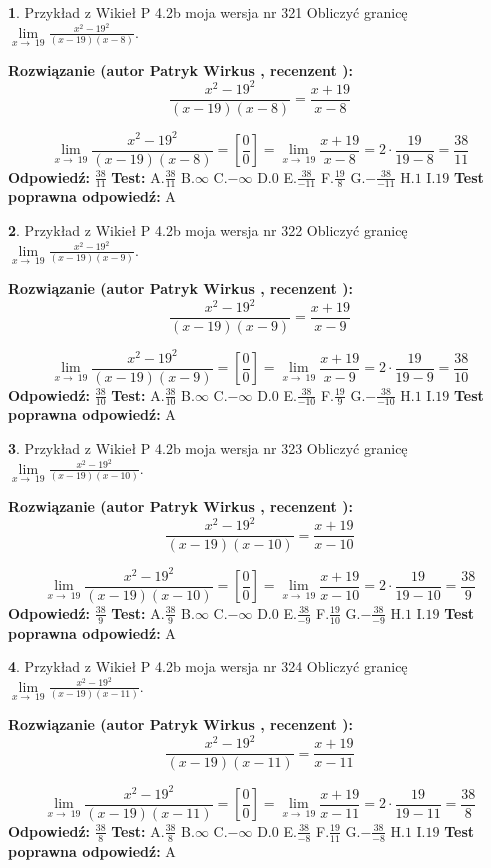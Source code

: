 \documentclass[12pt, a4paper]{article}
\theoremstyle{definition} %
\newtheorem{zad}{}
\newcommand{\zadStart}[1]{\begin{zad}#1\newline}
\newcommand{\zadStop}{\end{zad}}
\newcommand{\rozwStart}[2]{\noindent \textbf{Rozwiązanie (autor #1 , recenzent #2): }\newline}
\newcommand{\rozwStop}{\newline}
\newcommand{\odpStart}{\noindent \textbf{Odpowiedź:}\newline}
\newcommand{\odpStop}{\newline}
\newcommand{\testStart}{\noindent \textbf{Test:}\newline}
\newcommand{\testStop}{\newline}
\newcommand{\kluczStart}{\noindent \textbf{Test poprawna odpowiedź:}\newline}
\newcommand{\kluczStop}{\newline}
\begin{document}
\zadStart{Przykład z Wikieł P 4.2b moja wersja nr 321}
Obliczyć granicę $\lim\limits_{x\to\ 19}\frac{x^{2}-19^{2}}{(x-19)(x-8)}$.
\zadStop
\rozwStart{Patryk Wirkus}{}
$$\frac{x^{2}-19^{2}}{(x-19)(x-8)}=\frac{x+19}{x-8}$$

$$\lim\limits_{x\to\ 19}\frac{x^{2}-19^{2}}{(x-19)(x-8)}=[\frac{0}{0}]=\lim\limits_{x\to\ 19}\frac{x+19}{x-8}=2 \cdot \frac{19}{19-8} = \frac{38}{11}$$
\rozwStop
\odpStart
$\frac{38}{11}$
\odpStop
\testStart
A.$\frac{38}{11}$
B.$\infty$
C.$-\infty$
D.$0$
E.$\frac{38}{-11}$
F.$\frac{19}{8}$
G.$-\frac{38}{-11}$
H.$1$
I.$19$
\testStop
\kluczStart
A
\kluczStop



\zadStart{Przykład z Wikieł P 4.2b moja wersja nr 322}
Obliczyć granicę $\lim\limits_{x\to\ 19}\frac{x^{2}-19^{2}}{(x-19)(x-9)}$.
\zadStop
\rozwStart{Patryk Wirkus}{}
$$\frac{x^{2}-19^{2}}{(x-19)(x-9)}=\frac{x+19}{x-9}$$

$$\lim\limits_{x\to\ 19}\frac{x^{2}-19^{2}}{(x-19)(x-9)}=[\frac{0}{0}]=\lim\limits_{x\to\ 19}\frac{x+19}{x-9}=2 \cdot \frac{19}{19-9} = \frac{38}{10}$$
\rozwStop
\odpStart
$\frac{38}{10}$
\odpStop
\testStart
A.$\frac{38}{10}$
B.$\infty$
C.$-\infty$
D.$0$
E.$\frac{38}{-10}$
F.$\frac{19}{9}$
G.$-\frac{38}{-10}$
H.$1$
I.$19$
\testStop
\kluczStart
A
\kluczStop



\zadStart{Przykład z Wikieł P 4.2b moja wersja nr 323}
Obliczyć granicę $\lim\limits_{x\to\ 19}\frac{x^{2}-19^{2}}{(x-19)(x-10)}$.
\zadStop
\rozwStart{Patryk Wirkus}{}
$$\frac{x^{2}-19^{2}}{(x-19)(x-10)}=\frac{x+19}{x-10}$$

$$\lim\limits_{x\to\ 19}\frac{x^{2}-19^{2}}{(x-19)(x-10)}=[\frac{0}{0}]=\lim\limits_{x\to\ 19}\frac{x+19}{x-10}=2 \cdot \frac{19}{19-10} = \frac{38}{9}$$
\rozwStop
\odpStart
$\frac{38}{9}$
\odpStop
\testStart
A.$\frac{38}{9}$
B.$\infty$
C.$-\infty$
D.$0$
E.$\frac{38}{-9}$
F.$\frac{19}{10}$
G.$-\frac{38}{-9}$
H.$1$
I.$19$
\testStop
\kluczStart
A
\kluczStop



\zadStart{Przykład z Wikieł P 4.2b moja wersja nr 324}
Obliczyć granicę $\lim\limits_{x\to\ 19}\frac{x^{2}-19^{2}}{(x-19)(x-11)}$.
\zadStop
\rozwStart{Patryk Wirkus}{}
$$\frac{x^{2}-19^{2}}{(x-19)(x-11)}=\frac{x+19}{x-11}$$

$$\lim\limits_{x\to\ 19}\frac{x^{2}-19^{2}}{(x-19)(x-11)}=[\frac{0}{0}]=\lim\limits_{x\to\ 19}\frac{x+19}{x-11}=2 \cdot \frac{19}{19-11} = \frac{38}{8}$$
\rozwStop
\odpStart
$\frac{38}{8}$
\odpStop
\testStart
A.$\frac{38}{8}$
B.$\infty$
C.$-\infty$
D.$0$
E.$\frac{38}{-8}$
F.$\frac{19}{11}$
G.$-\frac{38}{-8}$
H.$1$
I.$19$
\testStop
\kluczStart
A
\kluczStop
\end{document}
